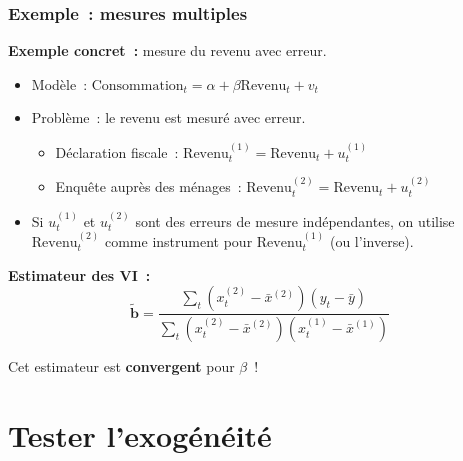 \documentclass[10pt]{beamer}
\begin{document}
\begin{frame}
  \frametitle{Exemple~: mesures multiples}

  \textbf{Exemple concret~:} mesure du revenu avec erreur.

  \begin{itemize}

  \item Modèle~: $\text{Consommation}_t = \alpha + \beta \text{Revenu}_t + v_t$

  \item Problème~: le revenu est mesuré avec erreur.
    \begin{itemize}
    \item Déclaration fiscale~: $\text{Revenu}_t^{(1)} = \text{Revenu}_t + u_t^{(1)}$
    \item Enquête auprès des ménages~: $\text{Revenu}_t^{(2)} = \text{Revenu}_t + u_t^{(2)}$
    \end{itemize}

  \item Si $u_t^{(1)}$ et $u_t^{(2)}$ sont des erreurs de mesure indépendantes,
    on utilise $\text{Revenu}_t^{(2)}$ comme instrument
    pour $\text{Revenu}_t^{(1)}$ (ou l'inverse).

  \end{itemize}

  \medskip

  \textbf{Estimateur des VI~:}
  \[ \tilde{\mathbf b} = \frac{\sum_t \left(x_t^{(2)} - \bar{x}^{(2)}\right)\left(y_t - \bar{y}\right)}{\sum_t \left(x_t^{(2)} - \bar{x}^{(2)}\right)\left(x_t^{(1)} - \bar{x}^{(1)}\right)} \]

  Cet estimateur est \textbf{convergent} pour $\beta$~!

\end{frame}


\section{Tester l'exogénéité}
\end{document}
